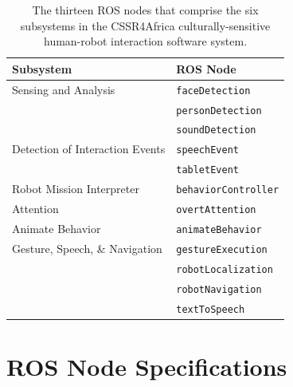 \documentclass{CSSRforAfrica}
\begin{document}
\begin{table}[thb]
\begin{center}
\begin{tabular}{|l |l|}
\hline 
 {\small Subsystem  }                                         &  {\small ROS Node }      \\
\hline
{\small Sensing and Analysis }	              & {\footnotesize \verb+faceDetection+} \\
                                                             &  {\footnotesize \verb+personDetection+}  \\
                                                             & {\footnotesize \verb+soundDetection+}  \\
\hline
{\small Detection of Interaction Events} & {\footnotesize \verb+speechEvent+} \\
                                                             & {\footnotesize \verb+tabletEvent+} \\
\hline
{\small Robot Mission Interpreter }                 &  {\footnotesize \verb+behaviorController+}  \\
\hline
{\small Attention}                                  & {\footnotesize \verb+overtAttention+} \\
\hline
{\small Animate Behavior }	              & {\footnotesize \verb+animateBehavior+} \\

\hline
{\small Gesture, Speech, \& Navigation} & {\footnotesize \verb+gestureExecution+} \\
                                                              & {\footnotesize \verb+robotLocalization+}  \\
                                                              & {\footnotesize \verb+robotNavigation+}  \\
                                                              & {\footnotesize \verb+textToSpeech+} \\
\hline
\end{tabular}
\end{center}
\caption{The thirteen ROS nodes that comprise the six subsystems in the CSSR4Africa culturally-sensitive human-robot interaction software system.}
\label{table:nodes}
\end{table}
  

\newpage

\section{ROS Node Specifications}
\label{section:nodes} 
\end{document}
